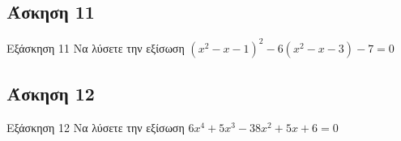 \documentclass[greek]{beamer}
\begin{document}
\subsection{Άσκηση 11}
\begin{frame}[label=Άσκηση11,t]{Εξάσκηση 11}
 Να λύσετε την εξίσωση $(x^2-x-1)^2-6(x^2-x-3)-7=0$

\end{frame}

\subsection{Άσκηση 12}
\begin{frame}[label=Άσκηση12,t]{Εξάσκηση 12}
 Να λύσετε την εξίσωση $6x^4+5x^3-38x^2+5x+6=0$

\end{frame}


%
%
%
%
%
%
%
\end{document}
